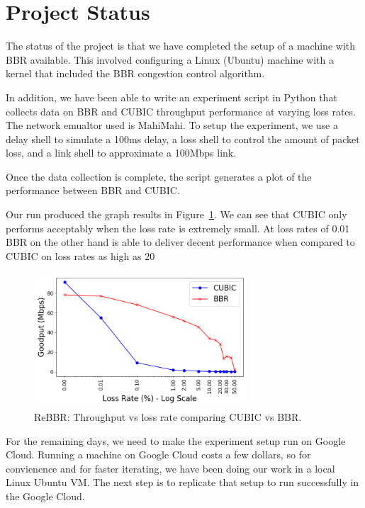 
\section{Project Status}

The status of the project is that we have completed the setup of a machine with BBR available. This involved
configuring a Linux (Ubuntu) machine with a kernel that included the BBR congestion control algorithm.

In addition, we have been able to write an experiment script in Python that collects data on BBR and CUBIC
throughput performance at varying loss rates. The network emualtor used is MahiMahi. To setup the experiment,
we use a delay shell to simulate a 100ms delay, a loss shell to control the amount of packet loss, and a link
shell to approximate a 100Mbps link.

Once the data collection is complete, the script generates a plot of the performance between BBR and CUBIC.

Our run produced the graph results in Figure~\ref{fig:rebbr8}. We can see that CUBIC only performs acceptably
when the loss rate is extremely small. At loss rates of 0.01%
BBR on the other hand is able to deliver decent performance when compared to CUBIC on loss rates as high as
20%


\begin{figure}[h]
  \centering
  \includegraphics[height=5cm]{./img/rebbr_fig8.png}
  \caption{ReBBR: Throughput vs loss rate comparing CUBIC vs BBR.}
  \label{fig:rebbr8}
\end{figure}



For the remaining days, we need to make the experiment setup run on Google Cloud. Running a machine on Google Cloud
costs a few dollars, so for convienence and for faster iterating, we have been doing our work in a local Linux Ubuntu
VM. The next step is to replicate that setup to run successfully in the Google Cloud.

